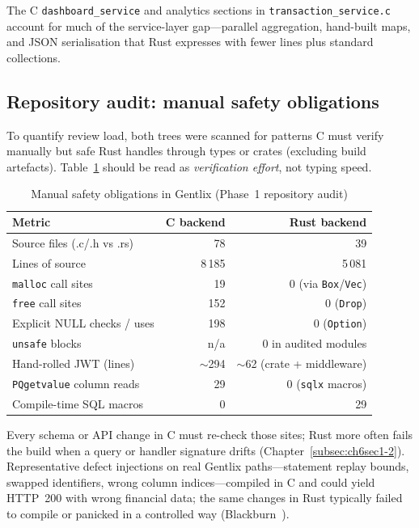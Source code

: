 \par The C \texttt{dashboard\_service} and analytics sections in \texttt{transaction\_service.c} 
account for much of the service-layer gap---parallel aggregation, hand-built maps, and JSON 
serialisation that Rust expresses with fewer lines plus standard collections.

\subsection{Repository audit: manual safety obligations}
\label{subsec:ch8sec1audit}

\par To quantify review load, both trees were scanned for patterns C must verify manually 
but safe Rust handles through types or crates (excluding build artefacts). Table~\ref{tab:audit_obligations} 
should be read as \emph{verification effort}, not typing speed.

\begin{table}[htbp]
\centering
\begin{tabular}{|l|r|r|}
\hline
\textbf{Metric} & \textbf{C backend} & \textbf{Rust backend} \\
\hline
Source files (.c/.h vs .rs) & 78 & 39 \\
Lines of source & 8\,185 & 5\,081 \\
\texttt{malloc} call sites & 19 & 0 (via \texttt{Box}/\texttt{Vec}) \\
\texttt{free} call sites & 152 & 0 (\texttt{Drop}) \\
Explicit NULL checks / uses & 198 & 0 (\texttt{Option}) \\
\texttt{unsafe} blocks & n/a & 0 in audited modules \\
Hand-rolled JWT (lines) & $\sim$294 & $\sim$62 (crate + middleware) \\
\texttt{PQgetvalue} column reads & 29 & 0 (\texttt{sqlx} macros) \\
Compile-time SQL macros & 0 & 29 \\
\hline
\end{tabular}
\caption{Manual safety obligations in Gentlix (Phase~1 repository audit)}
\label{tab:audit_obligations}
\end{table}

\par Every schema or API change in C must re-check those sites; Rust more often fails the 
build when a query or handler signature drifts (Chapter~\ref{subsec:ch6sec1-2}). Representative 
defect injections on real Gentlix paths---statement replay bounds, swapped identifiers, 
wrong column indices---compiled in C and could yield HTTP~200 with wrong financial data; 
the same changes in Rust typically failed to compile or panicked in a controlled way 
(Blackburn~\cite{Blackburn2025}).

